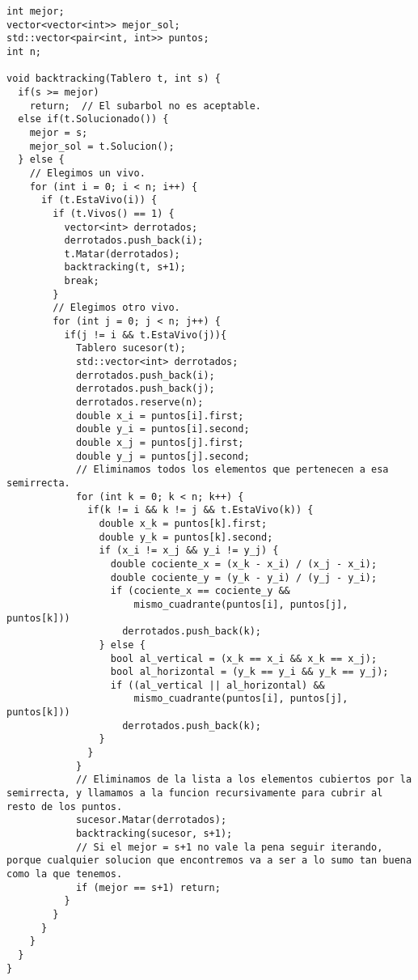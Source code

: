 \begin{lstlisting}[frame=single]
int mejor;
vector<vector<int>> mejor_sol;
std::vector<pair<int, int>> puntos;
int n;

void backtracking(Tablero t, int s) {
  if(s >= mejor)
    return;  // El subarbol no es aceptable.
  else if(t.Solucionado()) {
    mejor = s;
    mejor_sol = t.Solucion();
  } else {
    // Elegimos un vivo.
    for (int i = 0; i < n; i++) {
      if (t.EstaVivo(i)) {
        if (t.Vivos() == 1) {
          vector<int> derrotados;
          derrotados.push_back(i);
          t.Matar(derrotados);
          backtracking(t, s+1);
          break;
        }
        // Elegimos otro vivo.
        for (int j = 0; j < n; j++) {
          if(j != i && t.EstaVivo(j)){
            Tablero sucesor(t);
            std::vector<int> derrotados;
            derrotados.push_back(i);
            derrotados.push_back(j);
            derrotados.reserve(n);
            double x_i = puntos[i].first;
            double y_i = puntos[i].second;
            double x_j = puntos[j].first;
            double y_j = puntos[j].second;
            // Eliminamos todos los elementos que pertenecen a esa semirrecta.
            for (int k = 0; k < n; k++) {
              if(k != i && k != j && t.EstaVivo(k)) {
                double x_k = puntos[k].first;
                double y_k = puntos[k].second;
                if (x_i != x_j && y_i != y_j) {
                  double cociente_x = (x_k - x_i) / (x_j - x_i); 
                  double cociente_y = (y_k - y_i) / (y_j - y_i); 
                  if (cociente_x == cociente_y &&
                      mismo_cuadrante(puntos[i], puntos[j], puntos[k]))
                    derrotados.push_back(k);
                } else {
                  bool al_vertical = (x_k == x_i && x_k == x_j);
                  bool al_horizontal = (y_k == y_i && y_k == y_j);
                  if ((al_vertical || al_horizontal) &&
                      mismo_cuadrante(puntos[i], puntos[j], puntos[k]))
                    derrotados.push_back(k);
                }
              }
            }
            // Eliminamos de la lista a los elementos cubiertos por la semirrecta, y llamamos a la funcion recursivamente para cubrir al resto de los puntos.
            sucesor.Matar(derrotados);
            backtracking(sucesor, s+1);
            // Si el mejor = s+1 no vale la pena seguir iterando, porque cualquier solucion que encontremos va a ser a lo sumo tan buena como la que tenemos.
            if (mejor == s+1) return;
          }
        }
      }
    }
  }
}
\end{lstlisting}